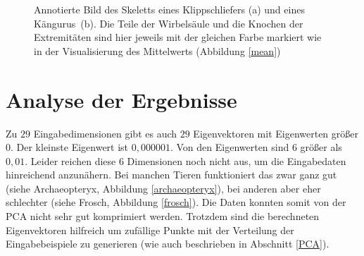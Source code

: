  \begin{figure}
  \qquad
  
  \caption{Annotierte Bild des Skeletts eines Klippschliefers (a) und eines \mbox{Kängurus (b)}. Die Teile der Wirbelsäule und die Knochen der Extremitäten sind hier jeweils mit der gleichen Farbe markiert wie in der Visualisierung des Mittelwerts (Abbildung \ref{mean})}
 \end{figure}
 

 \section{Analyse der Ergebnisse}
 \label{section_pca_result_analysis}
 
 Zu $29$ Eingabedimensionen gibt es auch $29$ Eigenvektoren mit Eigenwerten größer $0$. Der kleinste Eigenwert ist $0{,}000001$. Von den Eigenwerten sind $6$ größer als $0{,}01$. Leider reichen diese $6$ Dimensionen noch nicht aus, um die Eingabedaten hinreichend anzunähern. Bei manchen Tieren funktioniert das zwar ganz gut (siehe Archaeopteryx, Abbildung \ref{archaeopteryx}), bei anderen aber eher schlechter (siehe Frosch, Abbildung \ref{frosch}).
 Die Daten konnten somit von der PCA nicht sehr gut komprimiert werden. Trotzdem sind die berechneten Eigenvektoren hilfreich um zufällige Punkte mit der Verteilung der Eingabebeispiele zu generieren (wie auch beschrieben in Abschnitt \ref{PCA}).
 
